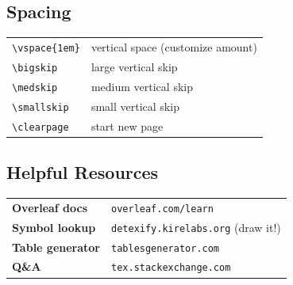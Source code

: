 \documentclass[../main.tex]{subfiles}
\begin{document}
\vspace{1em}

\subsection*{Spacing}
\begin{tabular}{ll}
\texttt{\textbackslash vspace\{1em\}} & vertical space (customize amount) \\
\texttt{\textbackslash bigskip} & large vertical skip \\
\texttt{\textbackslash medskip} & medium vertical skip \\
\texttt{\textbackslash smallskip} & small vertical skip \\
\texttt{\textbackslash clearpage} & start new page \\
\end{tabular}

\vspace{1em}

\subsection*{Helpful Resources}
\begin{tabular}{ll}
\textbf{Overleaf docs} & \texttt{overleaf.com/learn} \\
\textbf{Symbol lookup} & \texttt{detexify.kirelabs.org} (draw it!) \\
\textbf{Table generator} & \texttt{tablesgenerator.com} \\
\textbf{Q\&A} & \texttt{tex.stackexchange.com} \\
\end{tabular}

\clearpage
\end{document}
